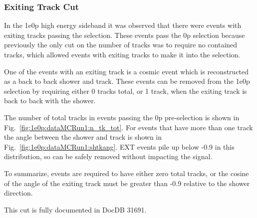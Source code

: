 \subsubsection{Exiting Track Cut}
\label{sec:sideband:newcuts:exitingtrack}
In the 1e0p high energy sideband it was observed that there were events with exiting tracks passing the selection. These events pass the 0p selection because previously the only cut on the number of tracks was to require no contained tracks, which allowed events with exiting tracks to make it into the selection. 

One of the events with an exiting track is a cosmic event which is reconstructed as a back to back shower and track. These events can be removed from the 1e0p selection by requiring either 0 tracks total, or 1 track, when the exiting track is back to back with the shower. 

The number of total tracks in events passing the 0p pre-selection is shown in Fig.~\ref{fig:1e0p:dataMCRun1:n_tk_tot}. For events that have more than one track the angle between the shower and track is shown in Fig.~\ref{fig:1e0p:dataMCRun1:shtkang}.  EXT events pile up below -0.9 in this distribution, so can be safely removed without impacting the signal.  

To summarize, events are required to have either zero total tracks, or the cosine of the angle of the exiting track must be greater than -0.9 relative to the shower direction. 

This cut is fully documented in DocDB 31691.

